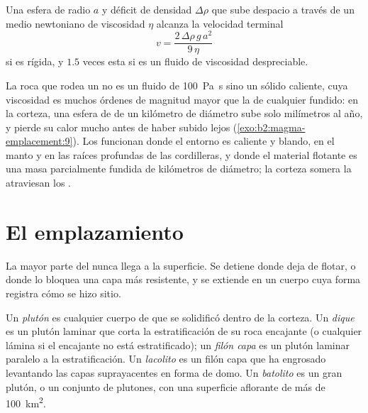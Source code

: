 \begin{proposition}\label{prop:b2:magma-emplacement:stokes}
Una esfera de radio $a$ y déficit de densidad $\Delta\rho$ que sube despacio a través de un
medio newtoniano de viscosidad $\eta$ alcanza la velocidad terminal
\[
v = \frac{2\,\Delta\rho\,g\,a^2}{9\,\eta}
\]
si es rígida, y $1.5$ veces esta si es un fluido de viscosidad despreciable.
\end{proposition}
\admitted

La roca que rodea un  no es un fluido de \qty{100}{Pa.s} sino un sólido caliente,
cuya viscosidad es muchos órdenes de magnitud mayor que la de cualquier fundido: en la
corteza, una esfera de  de un kilómetro de diámetro sube solo milímetros al año, y
pierde su calor mucho antes de haber subido lejos (\cref{exo:b2:magma-emplacement:9}). Los 
funcionan donde el entorno es caliente y blando, en el manto y en las raíces
profundas de las cordilleras, y donde el material flotante es una masa parcialmente fundida
de kilómetros de diámetro; la corteza somera la atraviesan los .

\section{El emplazamiento}

La mayor parte del  nunca llega a la superficie. Se detiene donde deja de flotar,
o donde lo bloquea una capa más resistente, y se extiende en un cuerpo cuya forma
registra cómo se hizo sitio.

\begin{definition}\label{def:b2:magma-emplacement:bodies}
Un \emph{plutón} es cualquier cuerpo de  que se solidificó dentro de la
corteza. Un \emph{dique} es un plutón laminar que corta la
estratificación de su roca encajante (o cualquier lámina si el encajante no está estratificado); un
\emph{filón capa} es un plutón laminar paralelo a la estratificación. Un
\emph{lacolito} es un filón capa que ha engrosado levantando las
capas suprayacentes en forma de domo. Un \emph{batolito} es un gran plutón,
o un conjunto de plutones, con una superficie aflorante de más de \qty{100}{km^2}.
\end{definition}

